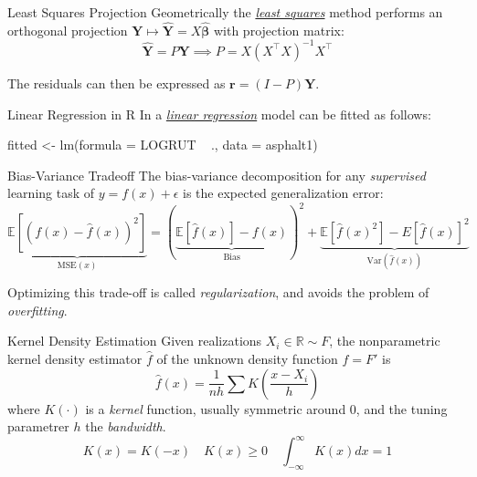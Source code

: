 \documentclass{cognito}
\begin{document}
\begin{note}{Least Squares Projection}
	Geometrically the \hyperref[note:Least Squares Estimator]{\it least squares} method
	performs an orthogonal projection $\bm{Y} \mapsto \hat{\bm{Y}} = X\hat{\bm{\beta}}$ with projection matrix:
	$$
		 \hat{\bm{Y}} = P\bm{Y} \implies P = X (X^\intercal X)^{-1} X^\intercal
	$$
	\begin{remark} The residuals can then be expressed as $\mathbf{r} = (I - P)\bm{Y}$.\end{remark}
	\vspace{-5pt}
\end{note}

\begin{note}{Linear Regression in R}
	In  a \hyperref[note:Multiple Linear Regression]{\it linear regression} model can be fitted as follows:
	\begin{code}
fitted <- lm(formula = LOGRUT ~ ., data = asphalt1)
	\end{code}
	\vspace{-5pt}
\end{note}

\begin{note}{Bias-Variance Tradeoff}
	The bias-variance decomposition
	for any \emph{supervised} learning task of $y = f(x) + \epsilon$ is the expected generalization error:
	$$
		\underbrace{\mathds{E}[(f(x) - \hat{f}(x))^2]}_{\text{MSE}(x)} = (\underbrace{\mathds{E}[\hat{f}(x)] - f(x)}_{\text{Bias}})^2
		+ \underbrace{\mathds{E}[\hat{f}(x)^2] - E[\hat{f}(x)]^2}_{\text{Var}(\hat{f}(x))}
	$$
	\begin{remark} Optimizing this trade-off is called \emph{regularization}, and avoids the problem of \emph{overfitting}.
	\end{remark}
	\vspace{-5pt}
\end{note}


\begin{note}{Kernel Density Estimation}
	Given realizations $X_i \in \mathds{R} \sim F$, the nonparametric kernel density estimator $\hat{f}$
	of the unknown density function $f = F'$ is
	$$
		\hat{f}(x) = \frac{1}{nh} \sum K\left(\frac{x - X_i}{h}\right)
	$$
	where $K(\cdot)$ is a \emph{kernel} function, usually symmetric around 0, and the tuning parametrer $h$ the \emph{bandwidth}.
	$$
		\textstyle K(x) = K(-x) \quad K(x) \geq 0 \quad \int_{-\infty}^\infty K(x) dx = 1
	$$
	\vspace{-10pt}
\end{note}
\end{document}
